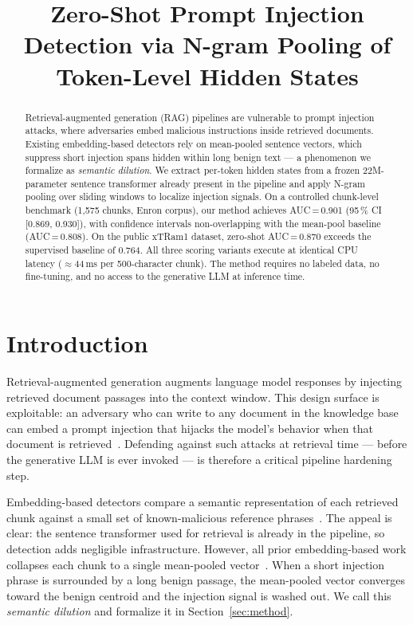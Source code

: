 \documentclass[conference]{IEEEtran}
\begin{document}
\title{Zero-Shot Prompt Injection Detection via N-gram Pooling of Token-Level Hidden States}

\author{
}

\maketitle

\begin{abstract}
Retrieval-augmented generation (RAG) pipelines are vulnerable to prompt injection
attacks, where adversaries embed malicious instructions inside retrieved documents.
Existing embedding-based detectors rely on mean-pooled sentence vectors, which
suppress short injection spans hidden within long benign text --- a phenomenon we
formalize as \emph{semantic dilution}. We extract per-token hidden states from a
frozen 22M-parameter sentence transformer already present in the pipeline and apply
N-gram pooling over sliding windows to localize injection signals. On a controlled
chunk-level benchmark (1,575 chunks, Enron corpus), our method achieves
AUC\,=\,0.901 (95\,\% CI [0.869, 0.930]), with confidence intervals non-overlapping
with the mean-pool baseline (AUC\,=\,0.808). On the public xTRam1 dataset, zero-shot
AUC\,=\,0.870 exceeds the supervised baseline of 0.764. All three scoring variants
execute at identical CPU latency (\(\approx\)44\,ms per 500-character chunk). The
method requires no labeled data, no fine-tuning, and no access to the generative LLM
at inference time.
\end{abstract}

\section{Introduction}
\label{sec:intro}

Retrieval-augmented generation augments language model responses by injecting
retrieved document passages into the context window. This design surface is
exploitable: an adversary who can write to any document in the knowledge base can
embed a prompt injection that hijacks the model's behavior when that document is
retrieved~\cite{yi2025bipia}. Defending against such attacks at retrieval time --- before the
generative LLM is ever invoked --- is therefore a critical pipeline hardening step.

Embedding-based detectors compare a semantic representation of each retrieved chunk
against a small set of known-malicious reference phrases~\cite{ayub2024embedding}. The
appeal is clear: the sentence transformer used for retrieval is already in the
pipeline, so detection adds negligible infrastructure. However, all prior
embedding-based work collapses each chunk to a single mean-pooled
vector~\cite{ayub2024embedding,alamsabi2026context}. When a short injection phrase is
surrounded by a long benign passage, the mean-pooled vector converges toward the
benign centroid and the injection signal is washed out. We call this \emph{semantic
dilution} and formalize it in Section~\ref{sec:method}.
\end{document}
